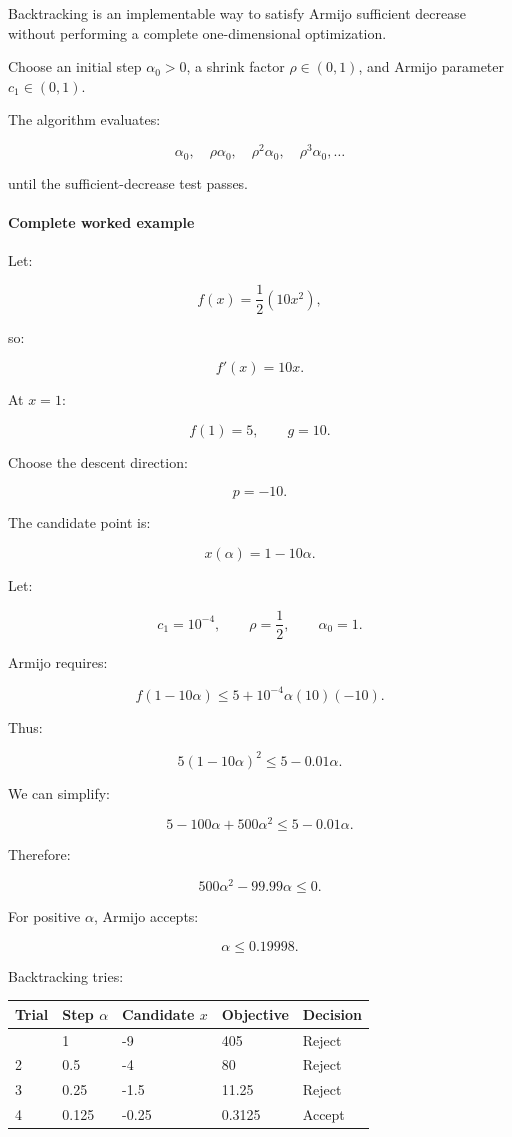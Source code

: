 Backtracking is an implementable way to satisfy Armijo sufficient decrease without performing a complete one-dimensional optimization.

Choose an initial step \(\alpha_0>0\), a shrink factor \(\rho\in(0,1)\), and Armijo parameter \(c_1\in(0,1)\).

The algorithm evaluates:

\[
\alpha_0,\quad \rho\alpha_0,\quad \rho^2\alpha_0,\quad \rho^3\alpha_0,\ldots
\]

until the sufficient-decrease test passes.

\paragraph{Complete worked example}\label{02-foundations-ii-ch026-complete-worked-example}

Let:

\[
f(x)=\frac12(10x^2),
\]

so:

\[
f'(x)=10x.
\]

At \(x=1\):

\[
f(1)=5,\qquad g=10.
\]

Choose the descent direction:

\[
p=-10.
\]

The candidate point is:

\[
x(\alpha)=1-10\alpha.
\]

Let:

\[
c_1=10^{-4},\qquad\rho=\frac12,\qquad\alpha_0=1.
\]

Armijo requires:

\[
f(1-10\alpha) \le 5+10^{-4}\alpha(10)(-10).
\]

Thus:

\[
5(1-10\alpha)^2\le5-0.01\alpha.
\]

We can simplify:

\[
5-100\alpha+500\alpha^2 \le5-0.01\alpha.
\]

Therefore:

\[
500\alpha^2-99.99\alpha\le0.
\]

For positive \(\alpha\), Armijo accepts:

\[
\boxed{\alpha\le0.19998}.
\]

Backtracking tries:

{\def\LTcaptype{none} %
\begin{longtable}[]{@{}lllll@{}}
\toprule\noalign{}
Trial & Step \(\alpha\) & Candidate \(x\) & Objective & Decision \\
\midrule\noalign{}
\endhead
\bottomrule\noalign{}
\endlastfoot
1 & 1 & -9 & 405 & Reject \\
2 & 0.5 & -4 & 80 & Reject \\
3 & 0.25 & -1.5 & 11.25 & Reject \\
4 & 0.125 & -0.25 & 0.3125 & Accept \\
\end{longtable}
}

